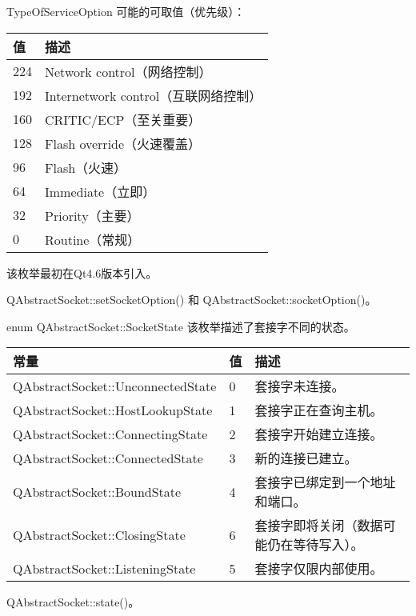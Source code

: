 TypeOfServiceOption 可能的可取值（优先级）：

\begin{tabular}{|l|l|}
\hline
值&	描述 \\
\hline
224&	Network control（网络控制）\\
\hline
192&	Internetwork control（互联网络控制）\\
\hline
160&	CRITIC/ECP（至关重要）\\
\hline
128&	Flash override（火速覆盖）\\
\hline
96&	Flash（火速）\\
\hline
64&	Immediate（立即）\\
\hline
32&	Priority（主要）\\
\hline
0&	Routine（常规） \\
\hline
\end{tabular}

该枚举最初在Qt4.6版本引入。

\begin{notice}[另请查阅]
QAbstractSocket::setSocketOption() 和 QAbstractSocket::socketOption()。
\end{notice}


\splitLine

enum QAbstractSocket::SocketState
该枚举描述了套接字不同的状态。

\begin{tabular}{|l|l|l|}
\hline
常量&	值&	描述 \\ 
\hline
QAbstractSocket::UnconnectedState&	0&	套接字未连接。\\
\hline
QAbstractSocket::HostLookupState&	1&	套接字正在查询主机。\\
\hline
QAbstractSocket::ConnectingState&	2&	套接字开始建立连接。\\
\hline
QAbstractSocket::ConnectedState&	3&	新的连接已建立。\\
\hline
QAbstractSocket::BoundState&	4&	套接字已绑定到一个地址和端口。\\
\hline
QAbstractSocket::ClosingState&	6&	套接字即将关闭（数据可能仍在等待写入）。\\
\hline
QAbstractSocket::ListeningState&	5&	套接字仅限内部使用。\\
\hline
\end{tabular}


\begin{notice}[另请查阅]
QAbstractSocket::state()。
\end{notice}

\splitLine

